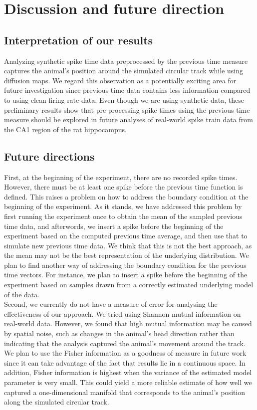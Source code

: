 \section{Discussion and future direction}

\subsection{Interpretation of our results}
Analyzing synthetic spike time data preprocessed by the previous time measure captures the animal's position around the simulated circular track while using diffusion maps. We regard this observation as a potentially exciting area for future investigation since previous time data contains less information compared to using clean firing rate data. Even though we are using  synthetic data, these preliminary results show that pre-processing spike times using the previous time  measure should be explored in future analyses of real-world spike train data from the CA1 region of the rat hippocampus. 

\subsection{Future directions}
First, at the beginning of the experiment, there are no recorded spike times. However, there must be at least one spike before  the previous time function is defined. This raises a problem on how to address the boundary condition at the beginning of the experiment. As it stands, we have addressed this problem by first running the experiment once to obtain the mean of the sampled previous time data, and afterwords, we insert a spike before the beginning of the experiment based on the computed previous time average, and then use that to simulate new  previous time data. We think that this is not the best approach, as the mean may not be the best representation of the underlying distribution. We plan to find another way of addressing the boundary condition for the previous time vectors. For instance, we plan to insert a spike before the beginning of the experiment based on samples drawn from a correctly estimated underlying model of the data.\\

Second, we currently do not have a measure of error for analysing the  effectiveness of our approach. 
We tried using Shannon mutual information on real-world data. However, we found that  high  mutual information may be caused by spatial noise, such as changes in the animal's head direction rather than indicating that the analysis captured the animal's movement around the track.  We plan to use the Fisher information as a goodness of measure in future work since it can take advantage of the fact that results lie in a continuous space. In addition, Fisher information is highest when  the variance of the estimated model parameter is very small. This could  yield a more reliable estimate of
how well we captured a one-dimensional manifold that corresponds to the animal's position along the simulated circular track. \\

